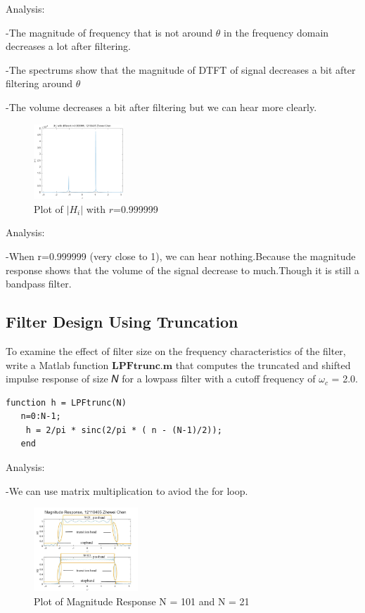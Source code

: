 \documentclass[journal]{IEEEtran}
\begin{document}
\textcolor[rgb]{0,0.6,1}{Analysis:}

\textcolor[rgb]{0,0.6,1}{-}The magnitude of frequency that is not around \(\theta \) in the frequency domain decreases a lot after filtering.

\textcolor[rgb]{0,0.6,1}{-}The spectrums show that the magnitude of DTFT of signal decreases a bit after filtering  around \(\theta\)

\textcolor[rgb]{0,0.6,1}{-}The volume decreases a bit after filtering but we can hear more clearly.



\begin{figure}[htbp]
   \centering
   \includegraphics[width=0.3\textwidth]{40.png}
\caption{Plot of \(\lvert H_{i}\rvert\) with \(r\)=0.999999}
   \end{figure}

\textcolor[rgb]{0,0.6,1}{Analysis:}

\textcolor[rgb]{0,0.6,1}{-}When r=0.999999 (very close to 1), we can hear nothing.Because the magnitude response shows that the volume of the signal decrease to much.Though it is still a bandpass filter. 

\subsection{Filter Design Using Truncation}
To examine the effect of filter size on the frequency characteristics of the filter, write a Matlab 
function \(\mathbf{LPFtrunc.m}\) that computes the truncated and shifted impulse response of size 𝑁 for a 
lowpass filter with a cutoff frequency of \(\omega_c\) = 2.0.
\begin{lstlisting}[title={LPFtrunc.m},style=Matlab-editor]
   function h = LPFtrunc(N)
   n=0:N-1;
    h = 2/pi * sinc(2/pi * ( n - (N-1)/2));
   end   
\end{lstlisting}

\textcolor[rgb]{0,0.6,1}{Analysis:}

\textcolor[rgb]{0,0.6,1}{-}We can use matrix multiplication to aviod the for loop.


\begin{figure}[H]
   \centering
   \includegraphics[width=0.35\textwidth]{61.png}
\caption{Plot of Magnitude Response N = 101 and N = 21}
   \end{figure}
\end{document}
